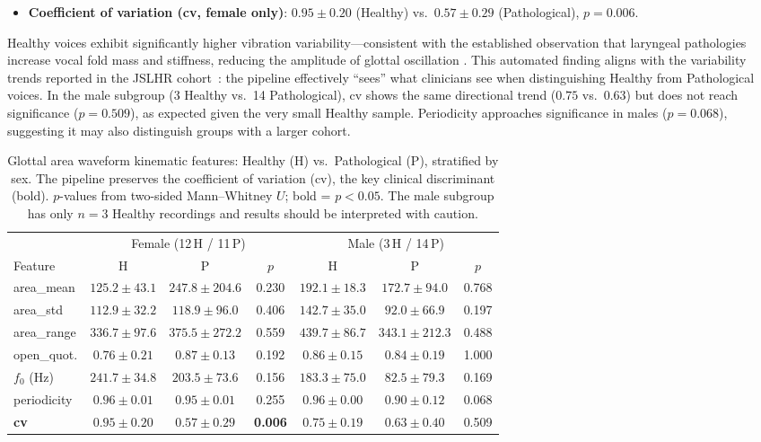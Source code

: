 \documentclass[preprint,12pt]{elsarticle}
\begin{document}
\begin{itemize}
  \item \textbf{Coefficient of variation (cv, female only)}:
    \(0.95\pm0.20\) (Healthy) vs.\ \(0.57\pm0.29\) (Pathological),
    $p{=}0.006$.
\end{itemize}

\noindent Healthy voices exhibit significantly higher vibration
variability---consistent with the established observation that laryngeal
pathologies increase vocal fold mass and stiffness, reducing the amplitude
of glottal oscillation
\cite{patel2016nodules,little2007glottal}.
This automated finding aligns with the variability trends reported in the
JSLHR cohort~\cite{patel2015kinematic}: the pipeline effectively
``sees'' what clinicians see when distinguishing Healthy from Pathological
voices.
In the male subgroup (\num{3} Healthy vs.\ \num{14} Pathological), cv
shows the same directional trend ($0.75$ vs.\ $0.63$) but does not reach
significance ($p{=}0.509$), as expected given the very small Healthy
sample.  Periodicity approaches significance in males ($p{=}0.068$),
suggesting it may also distinguish groups with a larger cohort.

\begin{table}[t]
\centering
\caption{Glottal area waveform kinematic features: Healthy (H) vs.\
  Pathological (P), stratified by sex.
  The pipeline preserves the coefficient
  of variation (cv), the key clinical discriminant (bold).
  $p$-values from two-sided Mann--Whitney $U$; bold = $p{<}0.05$.
  The male subgroup has only $n{=}3$ Healthy recordings and results
  should be interpreted with caution.}
\label{tab:gaw}
\small
\setlength{\tabcolsep}{3pt}
\begin{tabular}{l ccc ccc}
\toprule
 & \multicolumn{3}{c}{Female (12\,H / 11\,P)}
 & \multicolumn{3}{c}{Male (3\,H / 14\,P)} \\
\cmidrule(lr){2-4}\cmidrule(lr){5-7}
Feature & H & P & $p$ & H & P & $p$ \\
\midrule
area\_mean
  & $125.2{\pm}43.1$  & $247.8{\pm}204.6$ & 0.230
  & $192.1{\pm}18.3$  & $172.7{\pm}94.0$  & 0.768 \\
area\_std
  & $112.9{\pm}32.2$  & $118.9{\pm}96.0$  & 0.406
  & $142.7{\pm}35.0$  & $92.0{\pm}66.9$   & 0.197 \\
area\_range
  & $336.7{\pm}97.6$  & $375.5{\pm}272.2$ & 0.559
  & $439.7{\pm}86.7$  & $343.1{\pm}212.3$ & 0.488 \\
open\_quot.
  & $0.76{\pm}0.21$ & $0.87{\pm}0.13$ & 0.192
  & $0.86{\pm}0.15$ & $0.84{\pm}0.19$ & 1.000 \\
$f_0$ (Hz)
  & $241.7{\pm}34.8$  & $203.5{\pm}73.6$  & 0.156
  & $183.3{\pm}75.0$  & $82.5{\pm}79.3$   & 0.169 \\
periodicity
  & $0.96{\pm}0.01$ & $0.95{\pm}0.01$ & 0.255
  & $0.96{\pm}0.00$ & $0.90{\pm}0.12$ & 0.068 \\
\textbf{cv}
  & $\mathbf{0.95{\pm}0.20}$   & $\mathbf{0.57{\pm}0.29}$   & \textbf{0.006}
  & $0.75{\pm}0.19$   & $0.63{\pm}0.40$   & 0.509 \\
\bottomrule
\end{tabular}
\end{table}
\end{document}
